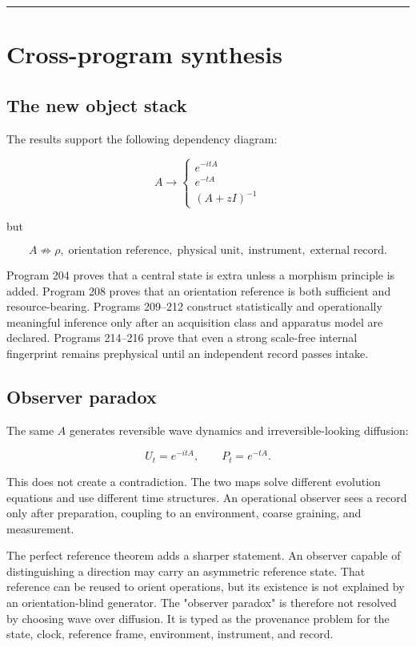 \documentclass[11pt,a4paper,openany]{report}
\begin{document}
\par\medskip\hrule\medskip

\chapter{Cross-program synthesis}

\section{The new object stack}

The results support the following dependency diagram:

\[
\boxed{A}
\longrightarrow
\begin{cases}
e^{-itA}\\
e^{-tA}\\
(A+zI)^{-1}
\end{cases}
\]

but

\[
A
\not\Longrightarrow
\rho,\;
\text{orientation reference},\;
\text{physical unit},\;
\text{instrument},\;
\text{external record}.
\]

Program 204 proves that a central state is extra unless a morphism principle is added. Program 208 proves that an orientation reference is both sufficient and resource-bearing. Programs 209--212 construct statistically and operationally meaningful inference only after an acquisition class and apparatus model are declared. Programs 214--216 prove that even a strong scale-free internal fingerprint remains prephysical until an independent record passes intake.

\section{Observer paradox}

The same \(A\) generates reversible wave dynamics and irreversible-looking diffusion:

\[
U_t=e^{-itA},
\qquad
P_t=e^{-tA}.
\]

This does not create a contradiction. The two maps solve different evolution equations and use different time structures. An operational observer sees a record only after preparation, coupling to an environment, coarse graining, and measurement.

The perfect reference theorem adds a sharper statement. An observer capable of distinguishing a direction may carry an asymmetric reference state. That reference can be reused to orient operations, but its existence is not explained by an orientation-blind generator. The "observer paradox" is therefore not resolved by choosing wave over diffusion. It is typed as the provenance problem for the state, clock, reference frame, environment, instrument, and record.
\end{document}
